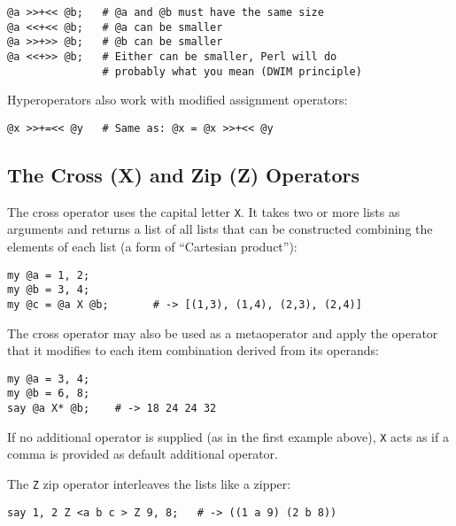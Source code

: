 \begin{verbatim}
@a >>+<< @b;   # @a and @b must have the same size
@a <<+<< @b;   # @a can be smaller
@a >>+>> @b;   # @b can be smaller
@a <<+>> @b;   # Either can be smaller, Perl will do 
               # probably what you mean (DWIM principle)
\end{verbatim}

Hyperoperators also work with modified assignment 
operators:

\begin{verbatim}
@x >>+=<< @y   # Same as: @x = @x >>+<< @y
\end{verbatim}

\subsection{The Cross (X) and Zip (Z) Operators}

The cross operator uses the capital letter \verb"X".
It takes two or more lists as arguments and returns a list 
of all lists that can be constructed combining the elements 
of each list (a form of ``Cartesian product''):

\begin{verbatim}
my @a = 1, 2;
my @b = 3, 4;
my @c = @a X @b;       # -> [(1,3), (1,4), (2,3), (2,4)]
\end{verbatim}

The cross operator may also be used as a metaoperator and 
apply the operator that it modifies to each item combination 
derived from its operands:

\begin{verbatim}
my @a = 3, 4;
my @b = 6, 8;
say @a X* @b;    # -> 18 24 24 32
\end{verbatim}

If no additional operator is supplied (as in the first 
example above), \verb"X" acts as if a comma is 
provided as default additional operator. 

The \verb"Z" zip operator interleaves the lists 
like a zipper:

\begin{verbatim}
say 1, 2 Z <a b c > Z 9, 8;   # -> ((1 a 9) (2 b 8))
\end{verbatim}

